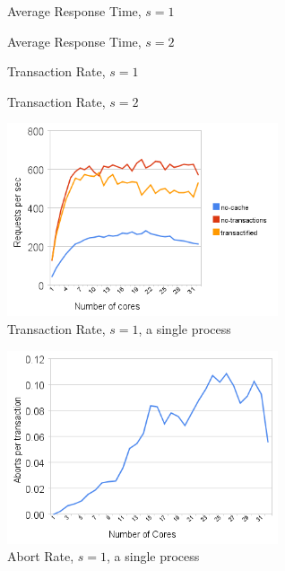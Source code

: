 \documentclass[preprint,natbib,11pt]{sigplanconf}
\begin{document}
\begin{figure}
 \begin{center}
 \end{center}
 \caption{Average Response Time, $s = 1$}
 \label{response-time-1}
\end{figure}
\begin{figure}
 \begin{center}
 \end{center}
 \caption{Average Response Time, $s = 2$}
 \label{response-time-2}
\end{figure}
\begin{figure}
 \begin{center}
 \end{center}
 \caption{Transaction Rate, $s = 1$}
 \label{transaction-rate-1}
\end{figure}
\begin{figure}
 \begin{center}
 \end{center}
 \caption{Transaction Rate, $s = 2$}
 \label{transaction-rate-2}
\end{figure}
\begin{figure}
 \begin{center}
  \includegraphics[width=8cm]{transaction-rate-single-process.png}
 \end{center}
 \caption{Transaction Rate, $s = 1$, a single process}
 \label{one-process-transaction-rate}
\end{figure}
\begin{figure}
 \begin{center}
  \includegraphics[width=8cm]{abort-rate.png}
 \end{center}
 \caption{Abort Rate, $s = 1$, a single process}
 \label{abort-rate}
\end{figure}
\end{document}
